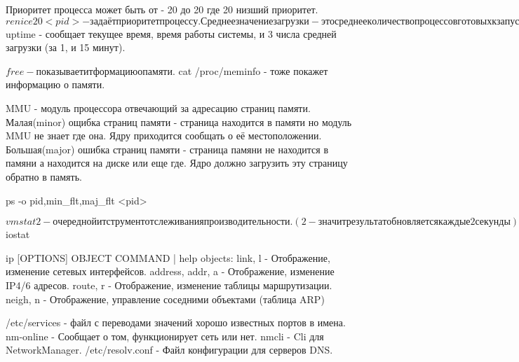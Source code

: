 Приоритет процесса может быть от - 20 до 20 где 20 низший приоритет.
$ renice 20 <pid> - задаёт приоритет процессу.
Среднее значение загрузки - это среднее количество процессов готовых к запуску 
                            (на исполнение для процесора).
$ uptime - сообщает текущее время, время работы системы, и 3 числа средней
загрузки (за 1, и 15 минут).

$ free - показывает итформацию о памяти.
$ cat /proc/meminfo - тоже покажет информацию о памяти.

MMU - модуль процессора отвечающий за адресацию страниц памяти.
    Малая(minor) ощибка страниц памяти - страница находится в памяти но модуль 
MMU не знает где она. Ядру приходится сообщать о её местоположении.
    Большая(major) ошибка страниц памяти - страница памяни не находится в памяни 
а находится на диске или еще где. Ядро должно загрузить эту страницу обратно в
память.

ps -o pid,min_flt,maj_flt <pid> 

$ vmstat 2 - очередной итструмент отслеживания производительности. (2 - значит
результат обновляется каждые 2 секунды).
Поля: %
proc:
 r - run
 b - blocked (запуск не разрешён)
memory:
 swpd - перемещено Kb на диск.
 free - свободно Kb памяти.
 buff - объём памяти для дисковых буферов.
swap:
 si - swap in.(не обязательно свап, может еще читать dll)
 so - swap out.
io:
 bi - blocks in
 bo - blocks out
system:
 in -
 cs -
cpu:
 us - %
 sy - %
 id - %
 wa - %

$ iostat


ip [OPTIONS] OBJECT {COMMAND | help}
objects:
    link, l - Отображение, изменение сетевых интерфейсов.
    address, addr, a - Отображение, изменение IP4/6 адресов.
    route, r - Отображение, изменение таблицы маршрутизации.
    neigh, n - Отображение, управление соседними объектами (таблица ARP)

/etc/services - файл с переводами значений хорошо известных портов в имена.
nm-online - Сообщает о том, функционирует сеть или нет.
nmcli - Cli для NetworkManager.
/etc/resolv.conf - Файл конфигурации для серверов DNS.

